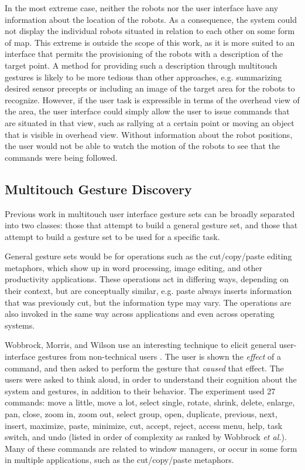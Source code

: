 In the most extreme case, neither the robots nor the user interface have any information about the location of the robots. 
As a consequence, the system could not display the individual robots situated in relation to each other on some form of map. 
This extreme is outside the scope of this work, as it is more suited to an interface that permits the provisioning of the robots with a description of the target point. 
A method for providing such a description through multitouch gestures is likely to be more tedious than other approaches, e.g. summarizing desired sensor precepts or including an image of the target area for the robots to recognize. 
However, if the user task is expressible in terms of the overhead view of the area, the user interface could simply allow the user to issue commands that are situated in that view, such as rallying at a certain point or moving an object that is visible in overhead view. 
Without information about the robot positions, the user would not be able to watch the motion of the robots to see that the commands were being followed. 

\subsection{Multitouch Gesture Discovery}
Previous work in multitouch user interface gesture sets can be broadly separated into two classes: those that attempt to build a general gesture set, and those that attempt to build a gesture set to be used for a specific task. 

General gesture sets would be for operations such as the cut/copy/paste editing metaphors, which show up in word processing, image editing, and other productivity applications. 
These operations act in differing ways, depending on their context, but are conceptually similar, e.g. paste always inserts information that was previously cut, but the information type may vary. The operations are also invoked in the same way across applications and even across operating systems. 

Wobbrock, Morris, and Wilson use an interesting technique to elicit general user-interface gestures from non-technical users \citep{wobbrock2009user}.
The user is shown the \textit{effect} of a command, and then asked to perform the gesture that \textit{caused} that effect. 
The users were asked to think aloud, in order to understand their cognition about the system and gestures, in addition to their behavior. 
The experiment used 27 commands: move a little, move a lot, select single, rotate, shrink, delete, enlarge, pan, close, zoom in, zoom out, select group, open, duplicate, previous, next, insert, maximize, paste, minimize, cut, accept, reject, access menu, help, task switch, and undo (listed in order of complexity as ranked by Wobbrock \textit{et al.}).
Many of these commands are related to window managers, or occur in some form in multiple applications, such as the cut/copy/paste metaphors.

